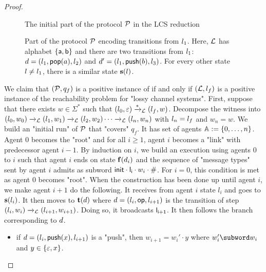 \begin{proof}
	\begin{figure}
	\centering
	
	\caption{The initial part of the protocol $\mathcal{P}$ in the LCS reduction}\label{fig:lcs-choice}
	\end{figure}

	\begin{figure}
	\centering
	
	\caption{Part of the protocol $\mathcal{P}$ encoding transitions from $l_1$. Here, $\mathcal{L}$ has alphabet $\{\mathsf{a},\mathsf{b}\}$ and there are two transitions from $l_1$: $d = (l_1, \mathsf{pop}(a), l_2)$ and $d' = (l_1, \mathsf{push}(b), l_3)$. For every other state $l \ne l_1$, there is a similar state $\mathbf{s}(l)$.}\label{fig:lcs-trans}
	\end{figure}
	We claim that $(\mathcal{P}, q_f)$ is a positive instance of \COVER if and only if $(\mathcal{L}, l_f)$ is a positive instance of the reachability problem for "lossy channel systems".
	First, suppose that there exists $w \in \Sigma^*$ such that $(l_0, \varepsilon) \xrightarrow{*}_{\mathcal{L}} (l_f, w)$. Decompose the witness into $(l_0, w_0) \xrightarrow{}_{\mathcal{L}} (l_1, w_1) \xrightarrow{}_{\mathcal{L}} (l_2, w_2) \cdots \xrightarrow{}_{\mathcal{L}} (l_n,w_n)$ with $l_n = l_f$ and $w_n =w$. 
	We build an "initial run" of $\mathcal{P}$ that "covers" $q_f$. It has set of agents $\mathbb{A} := \{0,\dots, n\}$. Agent $0$ becomes the "root" and for all $i \geq 1$, agent $i$ becomes a "link" with predecessor agent $i-1$. By induction on $i$, we build an execution using agents $0$ to $i$ such that agent $i$ ends on state $\mathbf{f}(d_i)$ and the sequence of "message types" sent by agent $i$ admits as subword $\mathsf{init} \cdot \mathsf{l_i} \cdot w_i \cdot \mathsf{\#}$. For $i=0$, this condition is met as agent $0$ becomes "root". When the construction has been done up until agent $i$, we make agent $i+1$ do the following. It receives from agent $i$ state $l_i$ and goes to $\mathbf{s}(l_i)$. It then moves to $\mathbf{t}(d)$ where $d = (l_i, \mathsf{op}, l_{i+1})$ is the transition of step $(l_i, w_i) \xrightarrow{}_{\mathcal{L}} (l_{i+1}, w_{i+1})$. Doing so, it broadcasts $\mathsf{l_{i+1}}$. It then follows the branch corresponding to $d$. 
	\begin{itemize}
		\item if $d =(l_i,\mathsf{push}(x), l_{i+1})$ is a "push", then $w_{i+1} = w_{i}' \cdot y$ where $w_i' \subword w_i$ and $y \in \{\varepsilon, x\}$. 

\end{itemize}
\end{proof}

